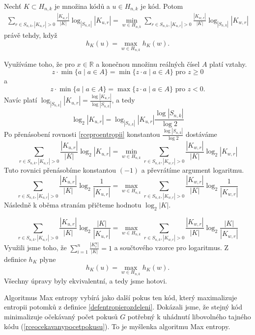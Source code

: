 \begin{veta} \label{vetaekvivalencemaxentropy}
    Nechť $K \subset H_{n,k}$ je množina kódů a $u \in H_{n,k}$ je kód. Potom
    \begin{align}\label{rceproentropii}
        \sum_{r\in S_{n,k}, |K_{u,r}| > 0} \frac{|K_{u,r}|}{|K|}\log_{|S_{n,k}|}|K_{u,r}| = \min_{w \in H_{n,k}} \sum_{r\in S_{n,k}, |K_{u,r}| > 0} \frac{|K_{w,r}|}{|K|}\log_{|S_{n,k}|}|K_{w,r}|
    \end{align}
    právě tehdy, když 
    \[h_K(u) = \max_{w \in H_{n,k}} h_K(w).\]
    
\end{veta}
\begin{dukaz} Využíváme toho, že pro $x \in \mathbb{R}$ a konečnou množinu reálných čísel $A$ platí vztahy.
\[z \cdot \min\{a \mid a \in A\} = \min\{z\cdot a \mid a \in A\} \textrm{ pro } z \geq 0\]
a 
\[z \cdot \min \{a \mid a \in A\} = \max\{z\cdot a \mid a \in A\}\textrm{ pro } z < 0.\]
Navíc platí $\log_{|S_{n,k}|} |K_{u,r}| = \frac{\log |K_{u,r}|}{\log |S_{n,k}|}$, a tedy
    \[\log_{2} |K_{u,r}| = \log_{|S_{n,k}|} |K_{u,r}|  \frac{\log |S_{n,k}|}{\log 2}\]
Po přenásobení rovnosti \ref{rceproentropii} konstantou $\frac{\log|S_{n,k}|}{\log2}$ dostáváme
\[\sum_{r\in S_{n,k}, |K_{u,r}| > 0} \frac{|K_{u,r}|}{|K|}\log_{2}|K_{u,r}| = \min_{w \in H_{n,k}} \sum_{r\in S_{n,k}, |K_{w,r}| > 0} \frac{|K_{w,r}|}{|K|}\log_{2}|K_{w,r}|\]
Tuto rovnici přenásobíme konstantou $(-1)$ a převrátíme argument logaritmu.
\[\sum_{r\in S_{n,k}, |K_{u,r}| > 0} \frac{|K_{u,r}|}{|K|}\log_{2}\frac{1}{|K_{u,r}|} = \max_{w \in H_{n,k}} \sum_{r\in S_{n,k}, |K_{w,r}| > 0} \frac{|K_{w,r}|}{|K|}\log_{2}\frac{1}{|K_{w,r}|}\]
Následně k oběma stranám přičteme hodnotu $\log_2|K|$.

\[\sum_{r\in S_{n,k}, |K_{u,r}| > 0} \frac{|K_{u,r}|}{|K|}\log_{2}\frac{|K|}{|K_{u,r}|} = \max_{w \in H_{n,k}} \sum_{r\in S_{n,k}, |K_{w,r}| > 0} \frac{|K_{w,r}|}{|K|}\log_{2}\frac{|K|}{|K_{w,r}|}\]
Využili jsme toho, že $\sum_{i=1}^n \frac{|K^u_i|}{|K|} = 1$ a součtového vzorce pro logaritmus. Z definice $h_K$ plyne 
\[h_K(u) = \max_{w \in H_{n,k}}  h_K(w) .\]
Všechny úpravy byly ekvivalentní, a tedy jsme hotovi.
\end{dukaz}

Algoritmus Max entropy vybírá jako další pokus ten kód, který maximalizuje entropii potomků z definice \ref{defentropierozdeleni}. Dokázali jsme, že stejný kód minimalizuje očekávaný počet pokusů $G$ potřebný k uhádnutí libovolného tajného kódu (\ref{rceocekavanypocetpokusu}). To je myšlenka algoritmu Max entropy.

